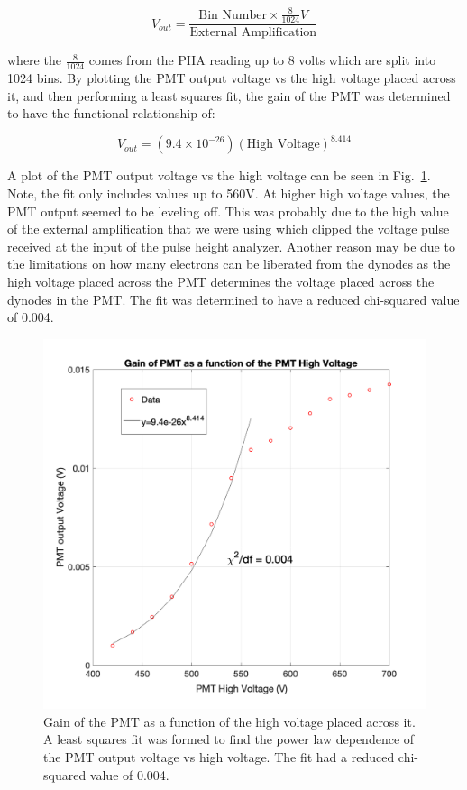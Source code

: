 \documentclass[%
 aip,
rsi,%
 amsmath,amssymb,
 reprint,%
author-numerical,%
]{revtex4-1}
\begin{document}
\begin{equation}
V _ { o u t } = \frac { \text{Bin Number}\times \frac { 8 } { 1024 } V } { \text {External Amplification} }
 \label{eq:six}
\end{equation}

\noindent where the $\frac { 8 } { 1024 }$ comes from the PHA reading up to 8 volts which are split into 1024 bins. By plotting the PMT output voltage vs the high voltage placed across it, and then performing a least squares fit, the gain of the PMT was determined to have the functional relationship of:

\begin{equation}
V _ { o u t } = (9.4\times10^{-26})(\text{High Voltage})^{8.414}
 \label{eq:seven}
\end{equation}

A plot of the PMT output voltage vs the high voltage can be seen in Fig.~\ref{fig:gain}. Note, the fit only includes values up to 560V. At higher high voltage values, the PMT output seemed to be leveling off. This was probably due to the high value of the external amplification that we were using which clipped the voltage pulse received at the input of the pulse height analyzer. Another reason may be due to the limitations on how many electrons can be liberated from the dynodes as the high voltage placed across the PMT determines the voltage placed across the dynodes in the PMT. The fit was determined to have a reduced chi-squared value of 0.004.

\begin{figure}[H]
\includegraphics[width=1\linewidth]{lateximages/gain.png} 
\caption{\label{fig:gain} Gain of the PMT as a function of the high voltage placed across it. A least squares fit was formed to find the power law dependence of the PMT output voltage vs high voltage. The fit had a reduced chi-squared value of 0.004.}
\end{figure}
\end{document}
